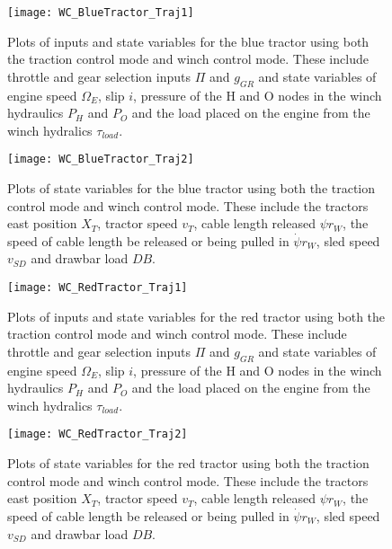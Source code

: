 \begin{figure}[hp]
    \centering
    \texttt{[image: WC\_BlueTractor\_Traj1]}
    \caption{Plots of inputs and state variables for the blue tractor using both the traction control mode and winch control mode. These include throttle and gear selection inputs $\Pi$ and $g_{GR}$ and state variables of engine speed $\Omega_E$, slip $i$, pressure of the H and O nodes in the winch hydraulics $P_H$ and $P_O$ and the load placed on the engine from the winch hydralics $\tau_{load}$.}
    \label{fig:WC_BlueTractor_Traj1}
\end{figure}
\begin{figure}[p]
    \centering
    \texttt{[image: WC\_BlueTractor\_Traj2]}
    \caption{Plots of state variables for the blue tractor using both the traction control mode and winch control mode. These include the tractors east position $X_T$, tractor speed $v_T$, cable length released $\psi r_W$, the speed of cable length be released or being pulled in $\dot{\psi} r_W$, sled speed $v_{SD}$ and drawbar load $DB$.}
    \label{fig:WC_BlueTractor_Traj2}
\end{figure}
\begin{figure}[p]
    \centering
    \texttt{[image: WC\_RedTractor\_Traj1]}
    \caption{Plots of inputs and state variables for the red tractor using both the traction control mode and winch control mode. These include throttle and gear selection inputs $\Pi$ and $g_{GR}$ and state variables of engine speed $\Omega_E$, slip $i$, pressure of the H and O nodes in the winch hydraulics $P_H$ and $P_O$ and the load placed on the engine from the winch hydralics $\tau_{load}$.}
    \label{fig:WC_RedTractor_Traj1}
\end{figure}
\begin{figure}[p]
    \centering
    \texttt{[image: WC\_RedTractor\_Traj2]}
    \caption{Plots of state variables for the red tractor using both the traction control mode and winch control mode. These include the tractors east position $X_T$, tractor speed $v_T$, cable length released $\psi r_W$, the speed of cable length be released or being pulled in $\dot{\psi} r_W$, sled speed $v_{SD}$ and drawbar load $DB$.}
    \label{fig:WC_RedTractor_Traj2}
\end{figure}
